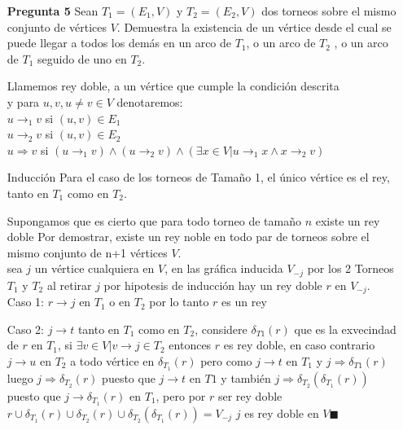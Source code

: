 \documentclass[12pt]{article}
\begin{document}
\lstset{language=python}

\begin{itemize}
\item[\bf{Pregunta 5}]Sean $T_{1}=(E_1,V)$ y $T_{2}=(E_2,V)$ dos torneos sobre el mismo conjunto de vértices $V$. Demuestra la existencia de un vértice desde el cual se puede llegar a todos los demás en un arco de $T_{1}$, o un arco de $T_{2}$ , o un arco de $T_{1}$ seguido de uno en $T_{2}$.

Llamemos rey doble, a un vértice que cumple la condición descrita \\
y para $u,v, u\neq v \in V$ denotaremos:\\
 $u \rightarrow_1 v$ si $(u,v) \in E_1$\\
 $u \rightarrow_2 v$ si $(u,v) \in E_2$\\
 $u \Rightarrow v$ si  $ (u \rightarrow_1 v) \wedge (u \rightarrow_2 v) \wedge (\exists x \in V | u \rightarrow_1 x \wedge x \rightarrow_2 v )$\\

\item[Inducción] Para el caso de los torneos de Tamaño 1, el único vértice es el rey, tanto en $T_1$ como en $T_2$.

  Supongamos que es cierto que para todo torneo de tamaño $n$ existe un rey doble
  Por demostrar, existe un rey noble en todo par de torneos sobre el mismo conjunto de n+1 vértices $V$.\\

  sea $j$ un vértice cualquiera en $V$, en las gráfica inducida $V_{-j}$ por los 2 Torneos $T_1$ y $T_2$ al retirar $j$ por hipotesis de inducción hay un rey doble $r$ en $V_{-j}$.\\
Caso 1: $r \rightarrow j $ en $T_1$ o en $T_2$  por lo tanto $r$ es un rey

Caso 2: $j \rightarrow t $ tanto en $T_1$ como en $T_2$, considere $\delta_{T1}(r)$ que 
es la exvecindad de $r$ en $T_1$, si $ \exists v \in V | v \rightarrow j  \in T_2 $ entonces $r$ es rey doble, en caso contrario  $j \rightarrow u $ en $T_2$ a todo 
vértice en $\delta_{T_1}(r)$ pero como $j \rightarrow t $ en $T_1 $  y
$ j \Rightarrow \delta_{T1}(r) $ luego $ j \Rightarrow \delta_{T_2}(r) $ puesto que 
$j \rightarrow t $ en $T1$ y también $ j \Rightarrow \delta_{T_2}(\delta_{T_1}(r))$ 
puesto que $j \rightarrow \delta_{T_1}(r) $ en $T_1$, pero por $r$ ser rey doble 
$r \cup \delta_{T_1}(r) \cup \delta_{T_2}(r) \cup \delta_{T_2}(\delta_{T_1}(r)) = V_{-j}$ $j$ es rey doble en $V \blacksquare$

\end{itemize}
\end{document}

